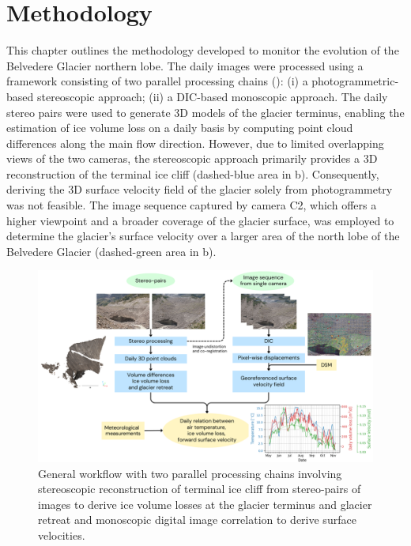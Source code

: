 \section{Methodology}\label{sec:4:methodology}
This chapter outlines the methodology developed to monitor the evolution of the Belvedere
Glacier northern lobe.
The daily images were processed using a framework consisting of two parallel processing
chains ():
(i) a photogrammetric-based stereoscopic approach;
(ii) a DIC-based monoscopic approach.
The daily stereo pairs were used to generate 3D models of the glacier terminus,
enabling the estimation of ice volume loss on a daily basis by computing point cloud
differences along the main flow direction.
However, due to limited overlapping views of the two cameras, the stereoscopic approach
primarily provides a 3D reconstruction of the terminal ice cliff (dashed-blue area in
b).
Consequently, deriving the 3D surface velocity field of the glacier solely from
photogrammetry was not feasible.
The image sequence captured by camera C2, which offers a higher viewpoint and a broader coverage of the glacier surface, was employed to determine the glacier's surface velocity over a larger area of the north lobe of the Belvedere Glacier (dashed-green area in b).

\begin{figure}[ht]
  \centering
  \includegraphics[width=\textwidth]{3_general_workflow.png}
  \caption{General workflow with two parallel processing chains involving stereoscopic
    reconstruction of terminal ice cliff from stereo-pairs of images to derive ice volume
    losses at the glacier terminus and glacier retreat and monoscopic digital image
    correlation to derive surface velocities.}
  \label{fig:4:workflow}
\end{figure}

